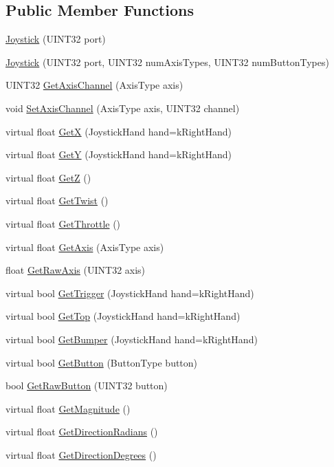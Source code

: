 \subsection*{\-Public \-Member \-Functions}
\begin{DoxyCompactItemize}
\item 
\hyperlink{classJoystick_aa4677050870682d557768df0b697e338}{\-Joystick} (\-U\-I\-N\-T32 port)
\item 
\hyperlink{classJoystick_a2364b408bb646f19ca04ebb2a2249cb1}{\-Joystick} (\-U\-I\-N\-T32 port, \-U\-I\-N\-T32 num\-Axis\-Types, \-U\-I\-N\-T32 num\-Button\-Types)
\item 
\-U\-I\-N\-T32 \hyperlink{classJoystick_a74e45168b9b71f6cd9b9bbe36f3bf29f}{\-Get\-Axis\-Channel} (\-Axis\-Type axis)
\item 
void \hyperlink{classJoystick_a4909b232134c0748bc61e223e3552396}{\-Set\-Axis\-Channel} (\-Axis\-Type axis, \-U\-I\-N\-T32 channel)
\item 
virtual float \hyperlink{classJoystick_a684f7ef395e7cf4d1137e816554446c9}{\-Get\-X} (\-Joystick\-Hand hand=k\-Right\-Hand)
\item 
virtual float \hyperlink{classJoystick_a6f413b0da6c62d848113409acc9cb971}{\-Get\-Y} (\-Joystick\-Hand hand=k\-Right\-Hand)
\item 
virtual float \hyperlink{classJoystick_a4e8c04b243729f58bf360a6584eac775}{\-Get\-Z} ()
\item 
virtual float \hyperlink{classJoystick_a3b29a1a8121657bd3ba4aa95db050a5f}{\-Get\-Twist} ()
\item 
virtual float \hyperlink{classJoystick_a3330cc651d36c58bffea669ff0b77161}{\-Get\-Throttle} ()
\item 
virtual float \hyperlink{classJoystick_a5f55e80b1399c3a04c5108488382dbc8}{\-Get\-Axis} (\-Axis\-Type axis)
\item 
float \hyperlink{classJoystick_a392fb94197b2e25a4172b0fa91b49b04}{\-Get\-Raw\-Axis} (\-U\-I\-N\-T32 axis)
\item 
virtual bool \hyperlink{classJoystick_a17c9682c8bbfd77d9377d2352fb836dd}{\-Get\-Trigger} (\-Joystick\-Hand hand=k\-Right\-Hand)
\item 
virtual bool \hyperlink{classJoystick_a451c9a35875271e7918af8843e39f3cc}{\-Get\-Top} (\-Joystick\-Hand hand=k\-Right\-Hand)
\item 
virtual bool \hyperlink{classJoystick_a411e29a474092407733498198b3c79a2}{\-Get\-Bumper} (\-Joystick\-Hand hand=k\-Right\-Hand)
\item 
virtual bool \hyperlink{classJoystick_ac8cf87154ee2b2241bc6d375dcebd728}{\-Get\-Button} (\-Button\-Type button)
\item 
bool \hyperlink{classJoystick_ae5af1b7f54545088da91894fd105e1e2}{\-Get\-Raw\-Button} (\-U\-I\-N\-T32 button)
\item 
virtual float \hyperlink{classJoystick_a98ca6faf135eed78d1401f779ea862c2}{\-Get\-Magnitude} ()
\item 
virtual float \hyperlink{classJoystick_a1ffd1a1d97440eb1a611361bdcac33fc}{\-Get\-Direction\-Radians} ()
\item 
virtual float \hyperlink{classJoystick_a0f49244825f4ce57aafde3830eba8e7f}{\-Get\-Direction\-Degrees} ()
\end{DoxyCompactItemize}
